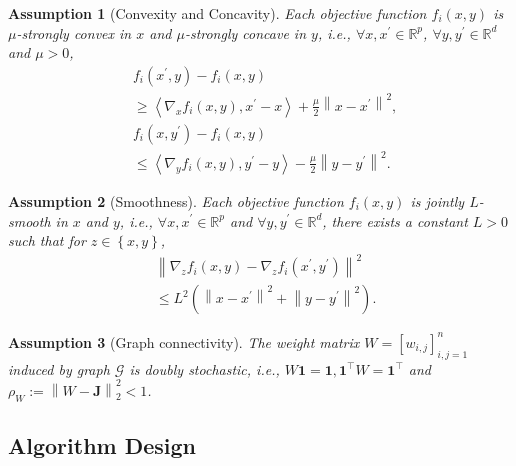 \documentclass[10pt,a4paper]{amsart}
\newtheorem{Ass}{Assumption}
\begin{document}
\begin{Ass}[Convexity and Concavity]\label{Ass_conv_conc}
Each objective function $f_i\left( x, y \right) $ is $\mu$-strongly convex in $x$ and $\mu$-strongly concave in $y$, i.e., $\forall x, x^{\prime}\in \mathbb{R}^p$, $\forall y, y^{\prime}\in \mathbb{R}^d$ and $\mu>0$,
\begin{equation*}
\begin{aligned}
&f_i\left( x^{\prime},y \right) -f_i\left( x,y \right) 
\\
&\geqslant \left< \nabla _xf_i\left( x,y \right) ,x^{\prime}-x \right> +\frac{\mu}{2}\left\| x-x^{\prime} \right\| ^2,
\\
&f_i\left( x,y^{\prime} \right) -f_i\left( x,y \right) 
\\
&\leqslant \left< \nabla _yf_i\left( x,y \right) ,y^{\prime}-y \right> -\frac{\mu}{2}\left\| y-y^{\prime} \right\| ^2.
\end{aligned}
\end{equation*}
\end{Ass}

\begin{Ass}[Smoothness]\label{Ass_smoothness}
Each objective function $f_i\left( x, y \right) $ is jointly $L$-smooth in $x$ and $y$, i.e., $\forall x, x^{\prime} \in \mathbb{R}^p$ and $\forall y, y^{\prime} \in \mathbb{R}^d$, there exists a constant $L>0$ such that for $z\in \left\{ x,y \right\}$,
\begin{equation*}
\begin{aligned}
&\left\| \nabla_z f_i\left( x,y \right) -\nabla_z f_i\left( x^{\prime},y^{\prime} \right) \right\| ^2
\\
&\leqslant L^2\left( \left\| x-x^{\prime} \right\| ^2+\left\| y-y^{\prime} \right\| ^2 \right).
\end{aligned}
\end{equation*}
\end{Ass}

\begin{Ass}[Graph connectivity] \label{Ass_graph}
The weight matrix $W=\left[ w_{i,j} \right] _{i,j=1}^{n}$ induced by graph $\mathcal{G}$ is doubly stochastic, i.e., $W\mathbf{1}=\mathbf{1},\mathbf{1}^{\top}W=\mathbf{1}^{\top}$ and $\rho _W:= \left\| W-\mathbf{J} \right\|_2 ^2 <1$.
\end{Ass}



\subsection{Algorithm Design}
\end{document}
